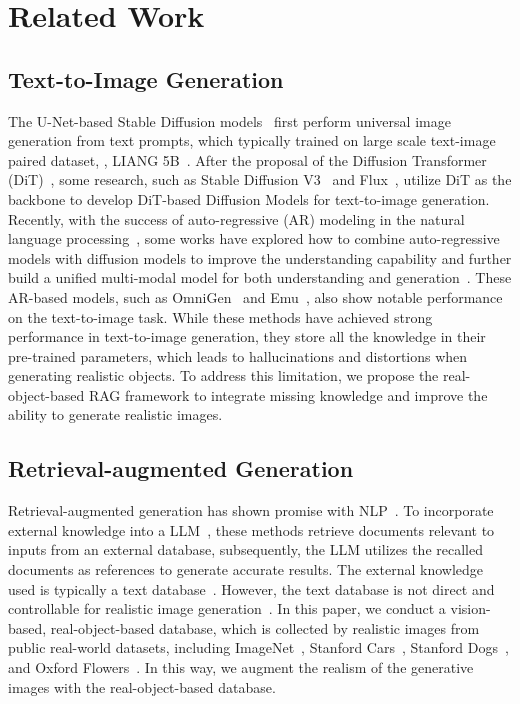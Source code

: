 \section{Related Work}
\subsection{Text-to-Image Generation}
The U-Net-based Stable Diffusion models~\cite{Rombach_2022_CVPR,podell2023sdxl} first perform universal image generation from text prompts, which typically trained on large scale text-image paired dataset, \aka, LIANG 5B~\cite{schuhmann2022laion}. After the proposal of the Diffusion Transformer (DiT)~\cite{peebles2023scalable}, some research, such as Stable Diffusion V3~\cite{esser2024scaling} and Flux~\cite{flux}, utilize DiT as the backbone to develop DiT-based Diffusion Models for text-to-image generation. Recently, with the success of auto-regressive (AR) modeling in the natural language processing~\cite{openai2023gpt4,touvron2023llama}, some works have explored how to combine auto-regressive models with diffusion models to improve the understanding capability and further build a unified multi-modal model for both understanding and generation~\cite{chen2024diffusion,xie2024show,zhou2024transfusion}. These AR-based models, such as OmniGen~\cite{xiao2024omnigen} and Emu~\cite{sun2024generative}, also show notable performance on the text-to-image task. While these methods have achieved strong performance in text-to-image generation, they store all the knowledge in their pre-trained parameters, which leads to hallucinations and distortions when generating realistic objects. To address this limitation, we propose the real-object-based RAG framework to integrate missing knowledge and improve the ability to generate realistic images.

\subsection{Retrieval-augmented Generation}
Retrieval-augmented generation has shown promise with NLP~\cite{lewis2020retrieval,guu2020retrieval}. To incorporate external knowledge into a LLM~\cite{gao2023retrieval,jiang2023active}, these methods retrieve documents relevant to inputs from an external database, subsequently, the LLM utilizes the recalled documents as references to generate accurate results. The external knowledge used is typically a text database~\cite{hashimoto2018retrieve,khandelwal2019generalization,shi2023replug}. However, the text database is not direct and controllable for realistic image generation~\cite{blattmann2022retrieval}. In this paper, we conduct a vision-based, real-object-based database, which is collected by realistic images from public real-world datasets, including ImageNet~\cite{deng2009imagenet}, Stanford Cars~\cite{krause20133d}, Stanford Dogs~\cite{dataset2011novel}, and Oxford Flowers~\cite{nilsback2008automated}. In this way, we augment the realism of the generative images with the real-object-based database.

